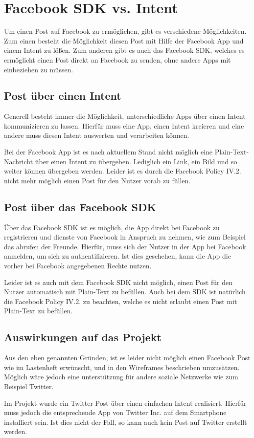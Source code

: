\section{Facebook SDK vs. Intent} \label{Facebook SDK}
Um einen Post auf Facebook zu erm\"oglichen, gibt es verschiedene M\"oglichkeiten. Zum einen besteht die M\"oglichkeit diesen Post mit Hilfe der Facebook App und einem Intent zu l\"o\ss{}en. Zum anderen gibt es auch das Facebook SDK, welches es erm\"oglicht einen Post direkt an Facebook zu senden, ohne andere Apps mit einbeziehen zu m\"ussen.

\subsection{Post \"uber einen Intent}
Generell besteht immer die M\"oglichkeit, unterschiedliche Apps \"uber einen Intent kommunizieren zu lassen. Hierf\"ur muss eine App, einen Intent kreieren und eine andere muss diesen Intent auswerten und verarbeiten k\"onnen.

Bei der Facebook App ist es nach aktuellem Stand nicht m\"oglich eine Plain-Text-Nachricht \"uber einen Intent zu \"ubergeben. Lediglich ein Link, ein Bild und so weiter k\"onnen \"ubergeben werden. Leider ist es durch die Facebook Policy IV.2. nicht mehr m\"oglich einen Post f\"ur den Nutzer vorab zu f\"ullen. \cite{fbPolicy2}


\subsection{Post \"uber das Facebook SDK}
\"Uber das Facebook SDK ist es m\"oglich, die App direkt bei Facebook zu registrieren und dienste von Facebook in Anspruch zu nehmen, wie zum Beispiel das abrufen der Freunde.
Hierf\"ur, muss sich der Nutzer in der App bei Facebook anmelden, um sich zu authentifizieren. Ist dies geschehen, kann die App die vorher bei Facebook angegebenen Rechte nutzen.

Leider ist es auch mit dem Facebook SDK nicht m\"oglich, einen Post f\"ur den Nutzer automatisch mit Plain-Text zu bef\"ullen. Auch bei dem SDK ist nat\"urlich die Facebook Policy IV.2. zu beachten, welche es nicht erlaubt einen Post mit Plain-Text zu bef\"ullen. \cite{fbPolicy2} 

\subsection{Auswirkungen auf das Projekt}
Aus den eben genannten Gr\"unden, ist es leider nicht m\"oglich einen Facebook Post wie im Lastenheft erw\"unscht, und in den Wireframes beschrieben umzus\"atzen.
M\"oglich w\"are jedoch eine unterst\"utzung f\"ur andere soziale Netzwerke wie zum Beispiel Twitter.

Im Projekt wurde ein Twitter-Post \"uber einen einfachen Intent realisiert. Hierf\"ur muss jedoch die entsprechende App von Twitter Inc. auf dem Smartphone installiert sein. Ist dies nicht der Fall, so kann auch kein Post auf Twitter erstellt werden.